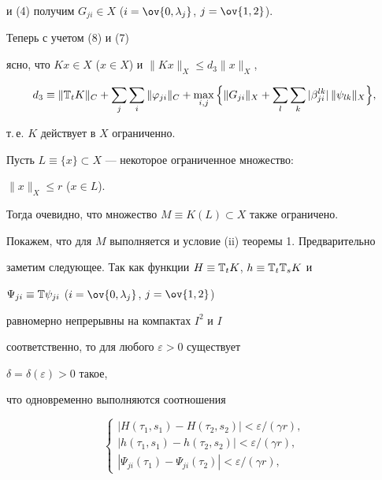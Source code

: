 \begin{pf}
и (4) получим $G_{j i}\in X$ ($i=\ov{0,\lambda_j}$, $j=\ov{1,2}$). 


Теперь с учетом (8) и (7) 


ясно, что $K x\in X$ ($x\in X$) и $\|K x\|_X\le d_3\|x\|_X$, 


$$ 


d_3\equiv\|\Bbb T_t K\|_C+\sum_j\sum_i\|\varphi_{j i}\|_C+ 


\max_{i,j}\Big\{\|G_{j i}\|_X+\sum_l\sum_k 


|\beta^{l k}_{j i}|\,\|\psi_{l k}\|_X\Big\}, 


$$ 


т.\,е. $K$ действует в $X$ ограниченно. 


 


Пусть $L\equiv\{x\}\subset X$ --- некоторое ограниченное множество: 


$\|x\|_X\le r$ ($x\in L$). 


Тогда очевидно, что множество $M\equiv K(L)\subset X$ также ограничено. 


 


Покажем, что для $M$ выполняется и условие (ii) теоремы 1. Предварительно 


заметим следующее. Так как функции $H\equiv\Bbb T_t K$, $h\equiv\Bbb 


T_t\Bbb T_s K$ и 


$\Psi_{j i}\equiv\Bbb T\psi_{j i}$ ($i=\ov{0,\lambda_j}$, $j=\ov{1,2}$) 


равномерно непрерывны на компактах $I^2$ и $I$ 


соответственно, то для любого $\varepsilon>0$ существует 


$\delta=\delta(\varepsilon)>0$ такое, 


что одновременно выполняются соотношения 


\begin{equation} 


\begin{cases} 


|H(\tau_1,s_1)-H(\tau_2,s_2)|<\varepsilon/(\gamma r), \\ 


|h(\tau_1,s_1)-h(\tau_2,s_2)|<\varepsilon/(\gamma r), \\ 


|\Psi_{j i}(\tau_1)-\Psi_{j i}(\tau_2)|<\varepsilon/(\gamma r), 


\end{cases} 



\end{equation}
\end{pf}
